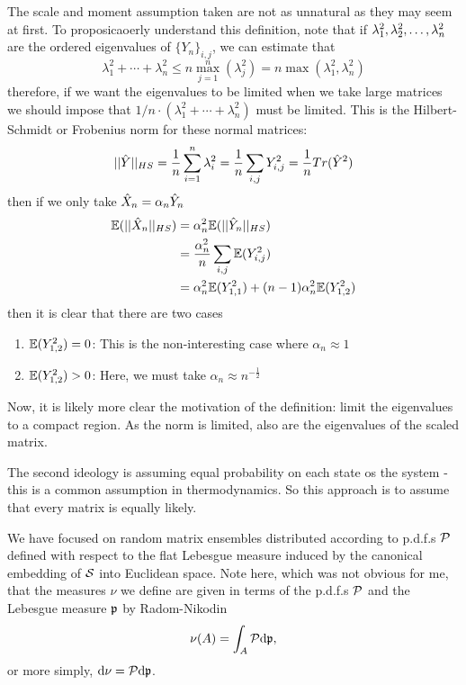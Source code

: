 The scale and moment assumption taken are not as unnatural as they may seem at first. To proposicaoerly understand this definition, note that if $\lambda^2_1, \lambda^2_2, \dots, \lambda^2_n$ are the ordered eigenvalues of $\{Y_n\}_{i,j}$, we can estimate that 
\begin{equation}
\lambda_1^2 + \cdots + \lambda_n^2 \leq n \max_{j=1}^{n}(\lambda_j^2) = n \max(\lambda_1^2, \lambda_n^2)
\end{equation}
therefore, if we want the eigenvalues to be limited when we take large matrices we should impose that $1/n \cdot (\lambda_1^2 + \cdots + \lambda_n^2)$ must be limited. This is the Hilbert-Schmidt or Frobenius norm for these normal matrices:
\begin{equation}
||\hat Y||_{HS} = \frac{1}{n} \sum_{i=1}^{n} \lambda_i^2 = \frac{1}{n} \sum_{i,j} Y_{i,j}^2 = \frac{1}{n} Tr(\hat Y^2)
\end{equation}
then if we only take $\hat X_n = \alpha_n \hat Y_n$
\begin{equation}
	\begin{split}
		\mathbb{E}(||\hat X_n||_{HS}) & = \alpha_n^2 \mathbb{E}(||\hat Y_n||_{HS}) \\
		& = \frac{\alpha_n^2}{n} \sum_{i,j} \mathbb{E}({Y_{i,j}^2}) \\
		& = \alpha_n^2 \mathbb{E}(Y_{1,1}^2) + (n-1) \alpha_n^2 \mathbb{E}(Y_{1,2}^2)
	\end{split}
\end{equation}
then it is clear that there are two cases
\begin{enumerate}
	\item $\mathbb{E}(Y^2_{1,2}) = 0$: This is the non-interesting case where $\alpha_n \approx 1$ 
	\item $\mathbb{E}(Y^2_{1,2}) > 0$: Here, we must take $\alpha_n \approx n^{-\frac{1}{2}}$ 
\end{enumerate}
Now, it is likely more clear the motivation of the definition: limit the eigenvalues to a compact region. As the norm is limited, also are the eigenvalues of the scaled matrix.

The second ideology is assuming equal probability on each state os the system - this is a common assumption in thermodynamics.  So this approach is to assume that every matrix is equally likely. 

\begin{obs}
	We have focused on random matrix ensembles distributed according to p.d.f.s $\mathcal{P}$ defined with respect to the flat Lebesgue measure induced by the canonical embedding of $\mathcal{S}$ into Euclidean space. Note here, which was not obvious for me, that the measures $\nu$ we define are given in terms of the p.d.f.s $\mathcal{P}$ and the Lebesgue measure $\mathfrak{p}$ by Radom-Nikodin \begin{equation}\nu(A) = \int_{A} \mathcal{P} \mathrm{d} \mathfrak{p},\end{equation} or more simply, $\mathrm{d} \nu = \mathcal{P} \mathrm{d} \mathfrak{p}$.
\end{obs}

